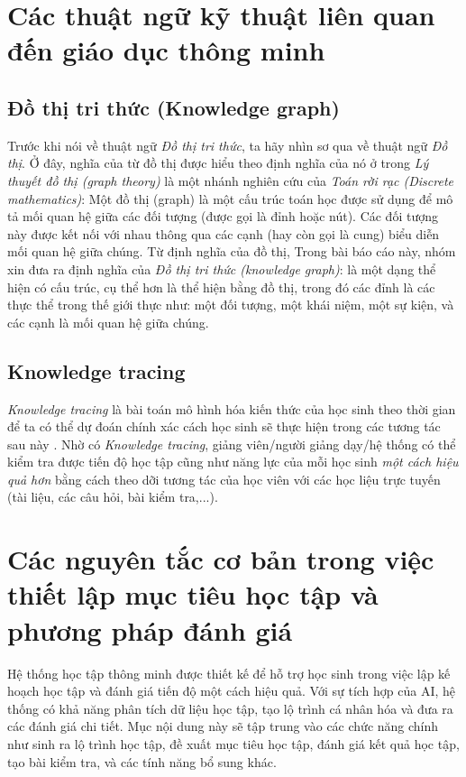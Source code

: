 \section{Các thuật ngữ kỹ thuật liên quan đến giáo dục thông minh}
\subsection{Đồ thị tri thức (Knowledge graph)}
Trước khi nói về thuật ngữ \emph{Đồ thị tri thức}, ta hãy nhìn sơ qua về thuật ngữ \emph{Đồ thị}. Ở đây, nghĩa của từ đồ thị được hiểu theo định nghĩa của nó ở trong \emph{Lý thuyết đồ thị (graph theory)} là một nhánh nghiên cứu của \emph{Toán rời rạc (Discrete mathematics)}: Một đồ thị (graph) là một cấu trúc toán học được sử dụng để mô tả mối quan hệ giữa các đối tượng (được gọi là đỉnh hoặc nút). Các đối tượng này được kết nối với nhau thông qua các cạnh (hay còn gọi là cung) biểu diễn mối quan hệ giữa chúng. Từ định nghĩa của đồ thị, Trong bài báo cáo này, nhóm xin đưa ra định nghĩa của \emph{Đồ thị tri thức (knowledge graph)}: là một dạng thể hiện có cấu trúc, cụ thể hơn là thể hiện bằng đồ thị, trong đó các đỉnh là các thực thể trong thế giới thực như: một đối tượng, một khái niệm, một sự kiện, và các cạnh là mối quan hệ giữa chúng\cite{ibm_knowledge_graph}.
\subsection{Knowledge tracing}
\emph{Knowledge tracing} là bài toán mô hình hóa kiến thức của học sinh theo thời gian để ta có thể dự đoán chính xác cách học sinh sẽ thực hiện trong các tương tác sau này \cite{10.5555/2969239.2969296}. Nhờ có \emph{Knowledge tracing}, giảng viên/người giảng dạy/hệ thống có thể kiểm tra được tiến độ học tập cũng như năng lực của mỗi học sinh \emph{một cách hiệu quả hơn} bằng cách theo dỡi tương tác của học viên với các học liệu trực tuyến (tài liệu, các câu hỏi, bài kiểm tra,...)\cite{10.1145/3569576}.\\

\section{Các nguyên tắc cơ bản trong việc thiết lập mục tiêu học tập và phương pháp đánh giá}

Hệ thống học tập thông minh được thiết kế để hỗ trợ học sinh trong việc lập kế hoạch học tập và đánh giá tiến độ một cách hiệu quả. Với sự tích hợp của AI, hệ thống có khả năng phân tích dữ liệu học tập, tạo lộ trình cá nhân hóa và đưa ra các đánh giá chi tiết. Mục nội dung này sẽ tập trung vào các chức năng chính như sinh ra lộ trình học tập, đề xuất mục tiêu học tập, đánh giá kết quả học tập, tạo bài kiểm tra, và các tính năng bổ sung khác. \par 

